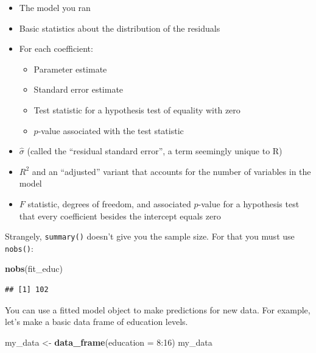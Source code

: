 \documentclass[12pt,oneside,openany]{book}
\newenvironment{Shaded}{\begin{snugshade}}{\end{snugshade}}
\newcommand{\KeywordTok}[1]{\textcolor[rgb]{0.13,0.29,0.53}{\textbf{{#1}}}}
\newcommand{\DataTypeTok}[1]{\textcolor[rgb]{0.13,0.29,0.53}{{#1}}}
\newcommand{\DecValTok}[1]{\textcolor[rgb]{0.00,0.00,0.81}{{#1}}}
\newcommand{\StringTok}[1]{\textcolor[rgb]{0.31,0.60,0.02}{{#1}}}
\newcommand{\NormalTok}[1]{{#1}}
\providecommand{\tightlist}{%
  \setlength{\itemsep}{0pt}\setlength{\parskip}{0pt}}
\begin{document}
\begin{itemize}
\tightlist
\item
  The model you ran
\item
  Basic statistics about the distribution of the residuals
\item
  For each coefficient:

  \begin{itemize}
  \tightlist
  \item
    Parameter estimate
  \item
    Standard error estimate
  \item
    Test statistic for a hypothesis test of equality with zero
  \item
    \(p\)-value associated with the test statistic
  \end{itemize}
\item
  \(\hat{\sigma}\) (called the ``residual standard error'', a term
  seemingly unique to R)
\item
  \(R^2\) and an ``adjusted'' variant that accounts for the number of
  variables in the model
\item
  \(F\) statistic, degrees of freedom, and associated \(p\)-value for a
  hypothesis test that every coefficient besides the intercept equals
  zero
\end{itemize}

Strangely, \texttt{summary()} doesn't give you the sample size. For that
you must use \texttt{nobs()}:

\begin{Shaded}
\begin{Highlighting}[]
\KeywordTok{nobs}\NormalTok{(fit_educ)}
\end{Highlighting}
\end{Shaded}

\begin{verbatim}
## [1] 102
\end{verbatim}

You can use a fitted model object to make predictions for new data. For
example, let's make a basic data frame of education levels.

\begin{Shaded}
\begin{Highlighting}[]
\NormalTok{my_data <-}\StringTok{ }\KeywordTok{data_frame}\NormalTok{(}\DataTypeTok{education =} \DecValTok{8}\NormalTok{:}\DecValTok{16}\NormalTok{)}
\NormalTok{my_data}
\end{Highlighting}
\end{Shaded}
\end{document}
